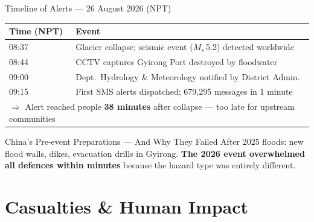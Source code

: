 \documentclass[aspectratio=169, 12pt]{beamer}
\begin{document}
	\begin{frame}{Timeline of Alerts --- 26 August 2026 (NPT)}
		\begin{block}{}
			\begin{tabular}{@{}ll@{}}
				\toprule
				\rowcolor{rpHighlightMid}
				\textbf{Time (NPT)} & \textbf{Event} \\
				\midrule
				08:37 & Glacier collapse; seismic event ($M_s$\,5.2) detected worldwide\\
				08:44 & CCTV captures Gyirong Port destroyed by floodwater \\
				09:00 & Dept.\ Hydrology \& Meteorology notified by District Admin. \\
				09:15 & First SMS alerts dispatched; 679{,}295 messages in 1 minute \\
				\midrule
				\multicolumn{2}{l}{{\color{rpLove}\small
						$\Rightarrow$ Alert reached people \textbf{38 minutes} after collapse
						--- too late for upstream communities}} \\
				\bottomrule
			\end{tabular}
		\end{block}
		
		\vspace{6pt}
		\begin{alertblock}{China's Pre-event Preparations --- And Why They Failed}
			After 2025 floods: new flood walls, dikes, evacuation drills in Gyirong.
			\textbf{The 2026 event overwhelmed all defences within minutes}
			because the hazard type was entirely different.
		\end{alertblock}
	\end{frame}
	
	\section{Casualties \& Human Impact}
	
\end{document}
